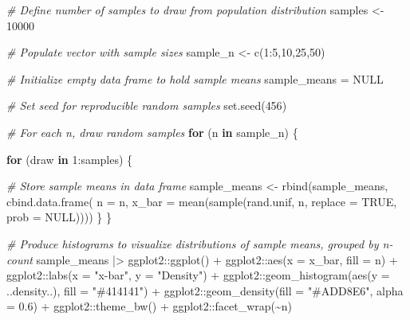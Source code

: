 \documentclass[
]{book}
\newenvironment{Shaded}{\begin{snugshade}}{\end{snugshade}}
\newcommand{\AttributeTok}[1]{\textcolor[rgb]{0.77,0.63,0.00}{#1}}
\newcommand{\CommentTok}[1]{\textcolor[rgb]{0.56,0.35,0.01}{\textit{#1}}}
\newcommand{\ConstantTok}[1]{\textcolor[rgb]{0.00,0.00,0.00}{#1}}
\newcommand{\ControlFlowTok}[1]{\textcolor[rgb]{0.13,0.29,0.53}{\textbf{#1}}}
\newcommand{\DecValTok}[1]{\textcolor[rgb]{0.00,0.00,0.81}{#1}}
\newcommand{\FloatTok}[1]{\textcolor[rgb]{0.00,0.00,0.81}{#1}}
\newcommand{\FunctionTok}[1]{\textcolor[rgb]{0.00,0.00,0.00}{#1}}
\newcommand{\NormalTok}[1]{#1}
\newcommand{\OtherTok}[1]{\textcolor[rgb]{0.56,0.35,0.01}{#1}}
\newcommand{\SpecialCharTok}[1]{\textcolor[rgb]{0.00,0.00,0.00}{#1}}
\newcommand{\StringTok}[1]{\textcolor[rgb]{0.31,0.60,0.02}{#1}}
\begin{document}
\begin{Shaded}
\begin{Highlighting}[]
\CommentTok{\# Define number of samples to draw from population distribution}
\NormalTok{samples }\OtherTok{\textless{}{-}} \DecValTok{10000}

\CommentTok{\# Populate vector with sample sizes}
\NormalTok{sample\_n }\OtherTok{\textless{}{-}} \FunctionTok{c}\NormalTok{(}\DecValTok{1}\SpecialCharTok{:}\DecValTok{5}\NormalTok{,}\DecValTok{10}\NormalTok{,}\DecValTok{25}\NormalTok{,}\DecValTok{50}\NormalTok{)}

\CommentTok{\# Initialize empty data frame to hold sample means}
\NormalTok{sample\_means }\OtherTok{=} \ConstantTok{NULL}

\CommentTok{\# Set seed for reproducible random samples}
\FunctionTok{set.seed}\NormalTok{(}\DecValTok{456}\NormalTok{)}

\CommentTok{\# For each n, draw random samples}
\ControlFlowTok{for}\NormalTok{ (n }\ControlFlowTok{in}\NormalTok{ sample\_n) \{}
  
  \ControlFlowTok{for}\NormalTok{ (draw }\ControlFlowTok{in} \DecValTok{1}\SpecialCharTok{:}\NormalTok{samples) \{}
    
      \CommentTok{\# Store sample means in data frame}
\NormalTok{      sample\_means }\OtherTok{\textless{}{-}} \FunctionTok{rbind}\NormalTok{(sample\_means, }\FunctionTok{cbind.data.frame}\NormalTok{(}
                            \AttributeTok{n =}\NormalTok{ n, }
                            \AttributeTok{x\_bar =} \FunctionTok{mean}\NormalTok{(}\FunctionTok{sample}\NormalTok{(rand.unif, n, }\AttributeTok{replace =} \ConstantTok{TRUE}\NormalTok{, }\AttributeTok{prob =} \ConstantTok{NULL}\NormalTok{))))}
\NormalTok{  \}}
\NormalTok{\}}

\CommentTok{\# Produce histograms to visualize distributions of sample means, grouped by n{-}count}
\NormalTok{sample\_means }\SpecialCharTok{|\textgreater{}}\NormalTok{ ggplot2}\SpecialCharTok{::}\FunctionTok{ggplot}\NormalTok{() }\SpecialCharTok{+} 
\NormalTok{                ggplot2}\SpecialCharTok{::}\FunctionTok{aes}\NormalTok{(}\AttributeTok{x =}\NormalTok{ x\_bar, }\AttributeTok{fill =}\NormalTok{ n) }\SpecialCharTok{+} 
\NormalTok{                ggplot2}\SpecialCharTok{::}\FunctionTok{labs}\NormalTok{(}\AttributeTok{x =} \StringTok{"x{-}bar"}\NormalTok{, }\AttributeTok{y =} \StringTok{"Density"}\NormalTok{) }\SpecialCharTok{+} 
\NormalTok{                ggplot2}\SpecialCharTok{::}\FunctionTok{geom\_histogram}\NormalTok{(}\FunctionTok{aes}\NormalTok{(}\AttributeTok{y =}\NormalTok{ ..density..), }\AttributeTok{fill =} \StringTok{"\#414141"}\NormalTok{) }\SpecialCharTok{+}
\NormalTok{                ggplot2}\SpecialCharTok{::}\FunctionTok{geom\_density}\NormalTok{(}\AttributeTok{fill =} \StringTok{"\#ADD8E6"}\NormalTok{, }\AttributeTok{alpha =} \FloatTok{0.6}\NormalTok{) }\SpecialCharTok{+}
\NormalTok{                ggplot2}\SpecialCharTok{::}\FunctionTok{theme\_bw}\NormalTok{() }\SpecialCharTok{+}
\NormalTok{                ggplot2}\SpecialCharTok{::}\FunctionTok{facet\_wrap}\NormalTok{(}\SpecialCharTok{\textasciitilde{}}\NormalTok{n)}
\end{Highlighting}
\end{Shaded}
\end{document}
